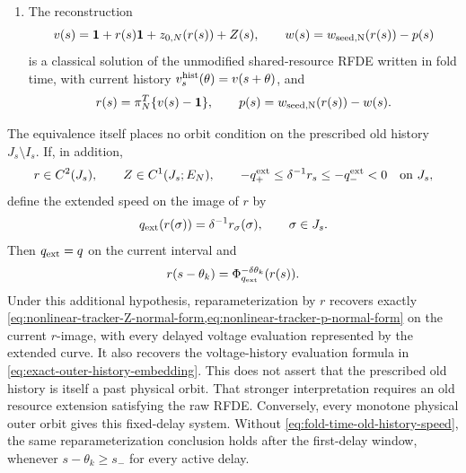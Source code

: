 \begin{proposition}
\begin{enumerate}[label=\textup{(\roman*)},leftmargin=2em]
\item The reconstruction
\begin{equation}
 v(s)=\mathbf1+r(s)\mathbf1+z_{0,N}(r(s))+Z(s),
 \qquad
 w(s)=w_{\rm seed,N}(r(s))-p(s)                  \label{eq:fold-time-tracker-reconstruction}
\end{equation}
is a classical solution of the unmodified shared-resource RFDE written in
fold time, with current history
\(v_s^{\rm hist}(\theta)=v(s+\theta)\), and
\[
 r(s)=\pi_N^T\{v(s)-\mathbf1\},\qquad
 p(s)=w_{\rm seed,N}(r(s))-w(s).
\]
\end{enumerate}

The equivalence itself places no orbit condition on the prescribed old
history \(J_s\setminus I_s\).  If, in addition,
\begin{equation}
 r\in C^2(J_s),\qquad Z\in C^1(J_s;E_N),\qquad
 -q_+^{\rm ext}\le\delta^{-1}r_s
       \le-q_-^{\rm ext}<0\quad\hbox{on }J_s,     \label{eq:fold-time-old-history-speed}
\end{equation}
define the extended speed on the image of \(r\) by
\[
 q_{\rm ext}(r(\sigma))=\delta^{-1}r_\sigma(\sigma),
 \qquad \sigma\in J_s.
\]
Then \(q_{\rm ext}=q\) on the current interval and
\begin{equation}
 r(s-\theta_k)=\Phi_{q_{\rm ext}}^{-\delta\theta_k}(r(s)).
                                                        \label{eq:fold-time-backtrack-identification}
\end{equation}
Under this additional hypothesis, reparameterization by \(r\) recovers exactly
\cref{eq:nonlinear-tracker-Z-normal-form,eq:nonlinear-tracker-p-normal-form}
on the current \(r\)-image, with every delayed voltage evaluation represented
by the extended curve.  It also recovers the voltage-history evaluation
formula in \cref{eq:exact-outer-history-embedding}.  This does not assert that
the prescribed old history is itself a past physical orbit.  That stronger
interpretation requires an old resource extension satisfying the raw RFDE.
Conversely, every monotone physical outer orbit gives this fixed-delay system.
Without \cref{eq:fold-time-old-history-speed}, the same reparameterization
conclusion holds after the first-delay window, whenever
\(s-\theta_k\ge s_-\) for every active delay.


\end{proposition}

